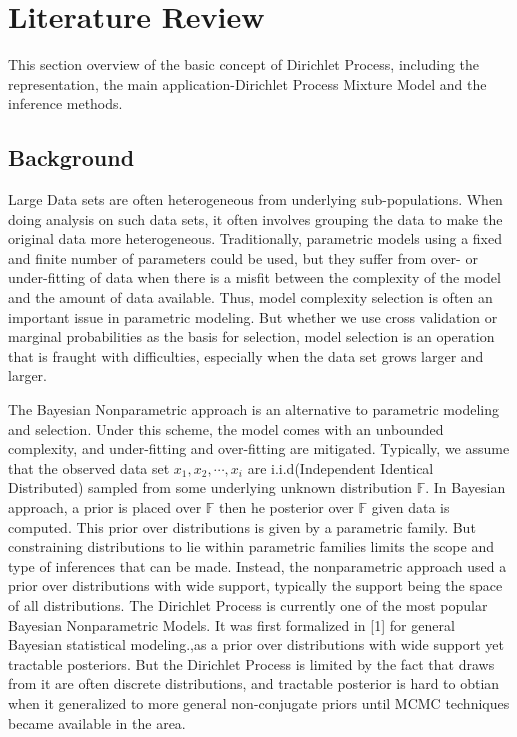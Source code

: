 \section{Literature Review}
This section overview of the basic concept of Dirichlet Process, including the representation, the main application-Dirichlet Process Mixture Model and the inference methods.  
\newcommand{\argmax}[1]{\underset{#1}{\operatorname{arg}\,\operatorname{max}}\;}
\newcommand{\argmin}[1]{\underset{#1}{\operatorname{arg}\,\operatorname{min}}\;}
\subsection{Background}
Large Data sets are often heterogeneous from underlying sub-populations. When doing analysis on such data sets, it often involves grouping the data to make the original data more heterogeneous. Traditionally, parametric models using a fixed and finite number of parameters could be used, but they suffer from over- or under-fitting of data when there is a misfit between the complexity of the model and the amount of data available. Thus, model complexity selection is often an important issue in parametric modeling. But whether we use cross validation or marginal probabilities as the basis for selection, model selection is an operation that is fraught with difficulties, especially when the data set grows larger and larger. 

The Bayesian Nonparametric approach is an alternative to parametric modeling and selection. Under this scheme, the model comes with an unbounded complexity, and under-fitting and over-fitting are mitigated. Typically, we assume that the observed data set $x_1,x_2,\cdots,x_i$ are i.i.d(Independent Identical Distributed) sampled from some underlying unknown distribution $\mathbb{F}$. In Bayesian approach,  a prior is placed over $\mathbb{F}$ then he posterior over  $\mathbb{F}$ given data is computed. This prior over distributions is given by a parametric family. But constraining distributions to lie within parametric families limits the scope and type of inferences that can be made. Instead, the nonparametric approach used a prior over distributions with wide support, typically the support being the space of all distributions.  The Dirichlet Process is currently one of the most popular Bayesian Nonparametric Models. It was first formalized in [1] for general Bayesian statistical modeling.,as a prior over distributions with wide support yet tractable posteriors. But the Dirichlet Process is limited by the fact that draws from it are often discrete distributions, and tractable posterior is hard to obtian when it generalized to more general non-conjugate priors until MCMC techniques became available in the area. 
